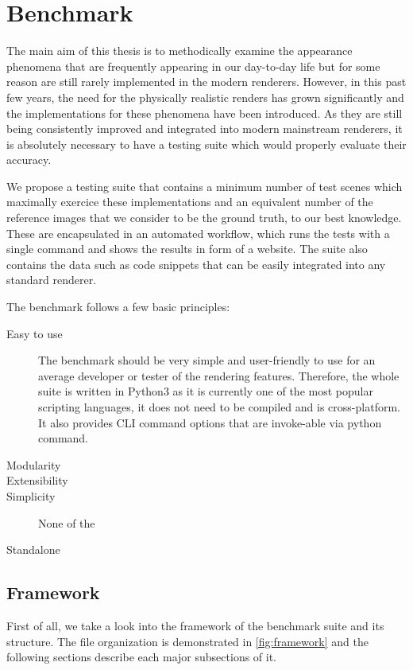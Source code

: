 \chapter{Benchmark}

The main aim of this thesis is to methodically examine the appearance phenomena that are frequently appearing in our day-to-day life but for some reason are still rarely implemented in the modern renderers. However, in this past few years, the need for the physically realistic renders has grown significantly and the implementations for these phenomena have been introduced. As they are still being consistently improved and integrated into modern mainstream renderers, it is absolutely necessary to have a testing suite which would properly evaluate their accuracy.

We propose a testing suite that contains a minimum number of test scenes which maximally exercice these implementations and an equivalent number of the reference images that we consider to be the ground truth, to our best knowledge. These are encapsulated in an automated workflow, which runs the tests with a single command and shows the results in form of a website. The suite also contains the data such as code snippets that can be easily integrated into any standard renderer.

The benchmark follows a few basic principles:

\begin{description}
	\item[Easy to use] The benchmark should be very simple and user-friendly to use for an average developer or tester of the rendering features. Therefore, the whole suite is written in Python3 as it is currently one of the most popular scripting languages, it does not need to be compiled and is cross-platform. It also provides CLI command options that are invoke-able via python command.
	\item[Modularity] 
	\item[Extensibility]
	\item[Simplicity] None of the 
	\item[Standalone]
\end{description}

\section{Framework}

First of all, we take a look into the framework of the benchmark suite and its structure. The file organization is demonstrated in \autoref{fig:framework} and the following sections describe each major subsections of it.

